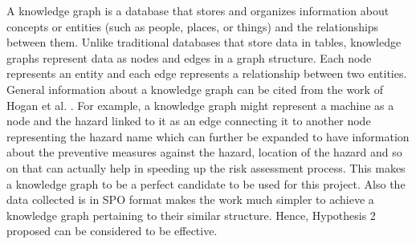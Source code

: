 A knowledge graph is a database that stores and organizes information about concepts or entities (such as people, places, or things) and the relationships between them. Unlike traditional databases that store data in tables, knowledge graphs represent data as nodes and edges in a graph structure. Each node represents an entity and each edge represents a relationship between two entities. General information about a knowledge graph can be cited from the work of Hogan et al. \cite{Hogan_2021}. For example, a knowledge graph might represent a machine as a node and the hazard linked to it as an edge connecting it to another node representing the hazard name which can further be expanded to have information about the preventive measures against the hazard, location of the hazard and so on that can actually help in speeding up the risk assessment process. This makes a knowledge graph to be a perfect candidate to be used for this project. Also the data collected is in SPO format makes the work much simpler to achieve a knowledge graph pertaining to their similar structure. Hence, Hypothesis 2 proposed can be considered to be effective.

